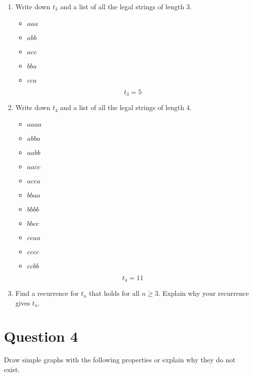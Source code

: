 \documentclass[11pt]{article}
\begin{document}
\begin{enumerate}[label= (\alph*)]
  \item Write down $t_3$ and a list of all the legal strings of length 3.

    \begin{itemize}
      \item $aaa$
      \item $abb$
      \item $acc$
      \item $bba$
      \item $cca$
    \end{itemize}

    \[ t_3 = 5 \]

  \item Write down $t_4$ and a list of all the legal strings of length 4.

    \begin{itemize}
      \item $aaaa$
      \item $abba$
      \item $aabb$
      \item $aacc$
      \item $acca$
      \item $bbaa$
      \item $bbbb$
      \item $bbcc$
      \item $ccaa$
      \item $cccc$
      \item $ccbb$
    \end{itemize}

    \[ t_4 = 11 \]

  \item Find a recurrence for $t_n$ that holds for all $n \geq 3$. Explain why
    your recurrence gives $t_n$.

\end{enumerate}

\section*{Question 4}
Draw simple graphs with the following properties or explain why they do not
exist.
\end{document}
